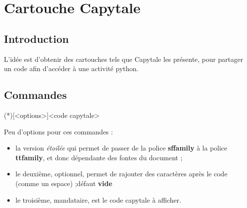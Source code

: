 \documentclass{article}
\newcommand\Cle[1]{{\bfseries\sffamily\textlangle #1\textrangle}}
\begin{document}
\newpage

\section{Cartouche Capytale}\label{capytale}

\subsection{Introduction}

\begin{codeidee}
L'idée est d'obtenir des \textsf{cartouches} tels que \textsf{Capytale} les présente, pour partager un code afin d'accéder à une activité \textsf{python}.
\end{codeidee}

\subsection{Commandes}

\begin{codetex}
\liencapytale(*)[<options>]{<code capytale>}
\end{codetex}

\begin{codecles}
Peu d'options pour ces commandes :

\begin{itemize}
	\item la version \textit{étoilée} qui permet de  passer de la police \Cle{sffamily} à la police \Cle{ttfamily}, et donc dépendante des fontes du document ;
	\item le deuxième, optionnel, permet de rajouter des caractères après le code (comme un \textsf{espace}) ;\hfill{}défaut \Cle{vide}
	\item le troisième, mandataire, est le \textsf{code capytale} à afficher.
\end{itemize}
\end{codecles}

\begin{codetex}



\end{codetex}
\end{document}

